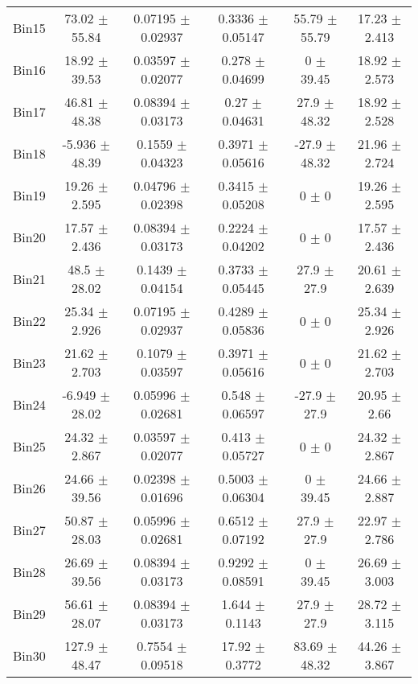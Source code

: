 \begin{tabular}{@{\extracolsep{4pt}}lccccc@{}}
     Bin15 & 73.02 $\pm$ 55.84 & 0.07195 $\pm$ 0.02937 & 0.3336 $\pm$ 0.05147 & 55.79 $\pm$ 55.79 & 17.23 $\pm$ 2.413 \\ 
     Bin16 & 18.92 $\pm$ 39.53 & 0.03597 $\pm$ 0.02077 & 0.278 $\pm$ 0.04699 & 0 $\pm$ 39.45 & 18.92 $\pm$ 2.573 \\ 
     Bin17 & 46.81 $\pm$ 48.38 & 0.08394 $\pm$ 0.03173 & 0.27 $\pm$ 0.04631 & 27.9 $\pm$ 48.32 & 18.92 $\pm$ 2.528 \\ 
     Bin18 & -5.936 $\pm$ 48.39 & 0.1559 $\pm$ 0.04323 & 0.3971 $\pm$ 0.05616 & -27.9 $\pm$ 48.32 & 21.96 $\pm$ 2.724 \\ 
     Bin19 & 19.26 $\pm$ 2.595 & 0.04796 $\pm$ 0.02398 & 0.3415 $\pm$ 0.05208 & 0 $\pm$ 0 & 19.26 $\pm$ 2.595 \\ 
     Bin20 & 17.57 $\pm$ 2.436 & 0.08394 $\pm$ 0.03173 & 0.2224 $\pm$ 0.04202 & 0 $\pm$ 0 & 17.57 $\pm$ 2.436 \\ 
     Bin21 & 48.5 $\pm$ 28.02 & 0.1439 $\pm$ 0.04154 & 0.3733 $\pm$ 0.05445 & 27.9 $\pm$ 27.9 & 20.61 $\pm$ 2.639 \\ 
     Bin22 & 25.34 $\pm$ 2.926 & 0.07195 $\pm$ 0.02937 & 0.4289 $\pm$ 0.05836 & 0 $\pm$ 0 & 25.34 $\pm$ 2.926 \\ 
     Bin23 & 21.62 $\pm$ 2.703 & 0.1079 $\pm$ 0.03597 & 0.3971 $\pm$ 0.05616 & 0 $\pm$ 0 & 21.62 $\pm$ 2.703 \\ 
     Bin24 & -6.949 $\pm$ 28.02 & 0.05996 $\pm$ 0.02681 & 0.548 $\pm$ 0.06597 & -27.9 $\pm$ 27.9 & 20.95 $\pm$ 2.66 \\ 
     Bin25 & 24.32 $\pm$ 2.867 & 0.03597 $\pm$ 0.02077 & 0.413 $\pm$ 0.05727 & 0 $\pm$ 0 & 24.32 $\pm$ 2.867 \\ 
     Bin26 & 24.66 $\pm$ 39.56 & 0.02398 $\pm$ 0.01696 & 0.5003 $\pm$ 0.06304 & 0 $\pm$ 39.45 & 24.66 $\pm$ 2.887 \\ 
     Bin27 & 50.87 $\pm$ 28.03 & 0.05996 $\pm$ 0.02681 & 0.6512 $\pm$ 0.07192 & 27.9 $\pm$ 27.9 & 22.97 $\pm$ 2.786 \\ 
     Bin28 & 26.69 $\pm$ 39.56 & 0.08394 $\pm$ 0.03173 & 0.9292 $\pm$ 0.08591 & 0 $\pm$ 39.45 & 26.69 $\pm$ 3.003 \\ 
     Bin29 & 56.61 $\pm$ 28.07 & 0.08394 $\pm$ 0.03173 & 1.644 $\pm$ 0.1143 & 27.9 $\pm$ 27.9 & 28.72 $\pm$ 3.115 \\ 
     Bin30 & 127.9 $\pm$ 48.47 & 0.7554 $\pm$ 0.09518 & 17.92 $\pm$ 0.3772 & 83.69 $\pm$ 48.32 & 44.26 $\pm$ 3.867 \\ 
\hline\hline
  \end{tabular}
